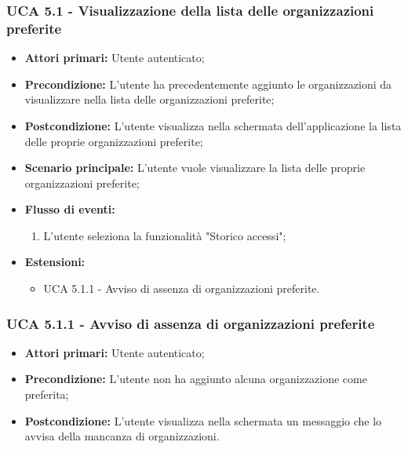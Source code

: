 \subsubsection{UCA 5.1 - Visualizzazione della lista delle organizzazioni preferite}
\begin{itemize}
    \item \textbf{Attori primari:} Utente autenticato;
    \item \textbf{Precondizione:} L'utente ha precedentemente aggiunto le organizzazioni da visualizzare nella lista delle organizzazioni preferite;
    \item \textbf{Postcondizione:} L'utente visualizza nella schermata dell'applicazione la lista delle proprie organizzazioni preferite; 
    \item \textbf{Scenario principale:} L'utente vuole visualizzare la lista delle proprie organizzazioni preferite; %
    \item \textbf{Flusso di eventi:}
    \begin{enumerate}
        \item L'utente seleziona la funzionalità "Storico accessi";
    \end{enumerate}
    \item \textbf{Estensioni:}
    \begin{itemize}
        \item UCA 5.1.1 - Avviso di assenza di organizzazioni preferite.
    \end{itemize}
\end{itemize}

\subsubsection{UCA 5.1.1 - Avviso di assenza di organizzazioni preferite}
\begin{itemize}
    \item \textbf{Attori primari:} Utente autenticato;
    \item \textbf{Precondizione:} L'utente non ha aggiunto alcuna organizzazione come preferita;
    \item \textbf{Postcondizione:} L'utente visualizza nella schermata un messaggio che lo avvisa della mancanza di organizzazioni.
\end{itemize}

